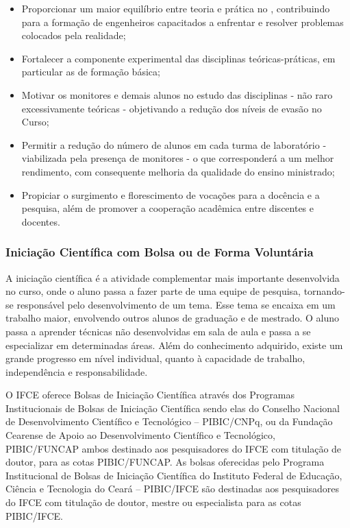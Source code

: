 \begin{itemize}
	\item Proporcionar um maior equilíbrio entre teoria e prática no \NOMECURSO, contribuindo para a formação de engenheiros capacitados a enfrentar e resolver problemas colocados pela realidade;
	\item Fortalecer a componente experimental das disciplinas teóricas-práticas, em particular as de formação básica;
	\item Motivar os monitores e demais alunos no estudo das disciplinas - não raro excessivamente teóricas - objetivando a redução dos níveis de evasão no Curso;
	\item Permitir a redução do número de alunos em cada turma de laboratório - viabilizada pela presença de monitores - o que corresponderá a um melhor rendimento, com consequente melhoria da qualidade do ensino ministrado;
	\item Propiciar o surgimento e florescimento de vocações para a docência e a pesquisa, além de promover a cooperação acadêmica entre discentes e docentes.
\end{itemize}


\subsubsection{Iniciação Científica com Bolsa ou de Forma Voluntária}

A iniciação científica é a atividade complementar mais importante desenvolvida no curso, onde
o aluno passa a fazer parte de uma equipe de pesquisa, tornando-se responsável pelo
desenvolvimento de um tema. Esse tema se encaixa em um trabalho maior,
envolvendo outros alunos de graduação e de mestrado. O aluno passa a
aprender técnicas não desenvolvidas em sala de aula e passa a se especializar em
determinadas áreas. Além do conhecimento adquirido, existe um grande progresso em
nível individual, quanto à capacidade de trabalho, independência e responsabilidade.

O IFCE oferece Bolsas de Iniciação Científica através dos Programas Institucionais de Bolsas de Iniciação Científica sendo elas do Conselho Nacional de Desenvolvimento Científico e Tecnológico – PIBIC/CNPq, ou da Fundação Cearense de Apoio ao Desenvolvimento Científico e Tecnológico, PIBIC/FUNCAP ambos destinado aos pesquisadores do IFCE com titulação de doutor, para as cotas PIBIC/FUNCAP. As bolsas oferecidas pelo Programa Institucional de Bolsas de Iniciação Científica do Instituto Federal de Educação, Ciência e Tecnologia do Ceará – PIBIC/IFCE são destinadas aos pesquisadores do IFCE com titulação de doutor, mestre ou especialista para as cotas PIBIC/IFCE.

